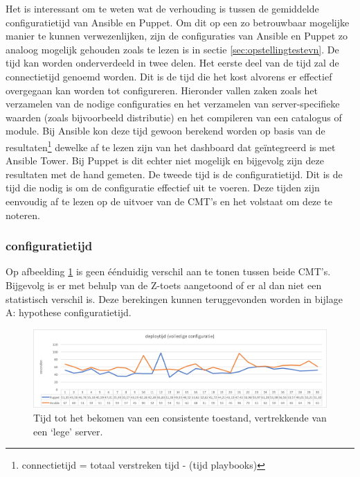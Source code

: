 Het is interessant om te weten wat de verhouding is tussen de gemiddelde \gls{configuratietijd} van Ansible en Puppet. Om dit op een zo betrouwbaar mogelijke manier te kunnen verwezenlijken, zijn de configuraties van Ansible en Puppet zo analoog mogelijk gehouden zoals te lezen is in sectie \ref{sec:opstellingtestevn}. De tijd kan worden onderverdeeld in twee delen.\newline
Het eerste deel van de tijd zal de \gls{connectietijd} genoemd worden. Dit is de tijd die het kost alvorens er effectief overgegaan kan worden tot configureren. Hieronder vallen zaken zoals het verzamelen van de nodige configuraties en het verzamelen van server-specifieke waarden (zoals bijvoorbeeld distributie) en het compileren van een catalogus of module. Bij Ansible kon deze tijd gewoon berekend worden op basis van de resultaten\footnote{connectietijd = totaal verstreken tijd -  \unexpanded{$ \sum  $} (tijd playbooks)} dewelke af te lezen zijn van het dashboard dat ge\"integreerd is met Ansible Tower. Bij Puppet is dit echter niet mogelijk en bijgevolg zijn deze resultaten met de hand gemeten.\newline
 De tweede tijd is de \gls{configuratietijd}. Dit is de tijd die nodig is om de configuratie effectief uit te voeren. Deze tijden zijn eenvoudig af te lezen op de uitvoer van de \gls{CMT}'s en het volstaat om deze te noteren.




\subsubsection{\gls{configuratietijd}}

Op afbeelding \ref{fig:deploytime_fullconfig} is geen \'e\'enduidig verschil aan te tonen tussen beide \gls{CMT}'s. Bijgevolg is er met behulp van de Z-toets aangetoond of er al dan niet een statistisch verschil is. Deze berekingen kunnen teruggevonden worden in bijlage A: hypothese configuratietijd.

\begin{figure}
	\includegraphics[width=\linewidth]{img/deploytime_fullconfig.png} 
	\caption{Tijd tot het bekomen van een consistente toestand, vertrekkende van een ‘lege' server.}  
	\label{fig:deploytime_fullconfig}
\end{figure}


